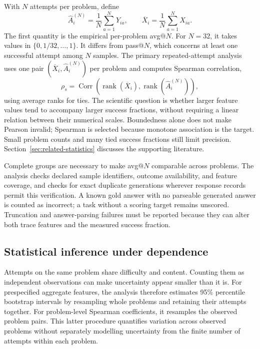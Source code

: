 \documentclass[12pt,a4paper,twoside,openright]{book}
\begin{document}
With $N$ attempts per problem, define
\begin{equation}
  \widehat A_i^{(N)}=\frac{1}{N}\sum_{a=1}^{N}Y_{ia},
  \qquad \overline X_i=\frac{1}{N}\sum_{a=1}^{N}X_{ia}.
  \label{eq:average-accuracy}
\end{equation}
The first quantity is the empirical per-problem avg@$N$. For $N=32$, it
takes values in $\{0,1/32,\ldots,1\}$. It differs from pass@$N$, which concerns
at least one successful attempt among $N$ samples. The primary repeated-attempt
analysis uses one pair $(\overline X_i,\widehat A_i^{(N)})$ per problem and
computes Spearman correlation,
\begin{equation}
  \rho_s=\operatorname{Corr}\!\left(
    \operatorname{rank}(\overline X_i),
    \operatorname{rank}(\widehat A_i^{(N)})\right),
  \label{eq:spearman}
\end{equation}
using average ranks for ties. The scientific question is whether larger
feature values tend to accompany larger success fractions, without requiring
a linear relation between their numerical scales. Boundedness alone does not
make Pearson invalid; Spearman is selected because monotone association is
the target. Small problem counts and many tied success fractions still limit
precision. Section~\ref{sec:related-statistics} discusses the supporting
literature.

Complete groups are necessary to make avg@$N$ comparable across problems.
The analysis checks declared sample identifiers, outcome availability, and
feature coverage, and checks for exact duplicate generations wherever
response records permit this verification. A known gold answer with no parseable generated
answer is counted as incorrect; a task without a scoring target remains
unscored. Truncation and answer-parsing failures must be reported because
they can alter both trace features and the measured success fraction.

\subsection{Statistical inference under dependence}

Attempts on the same problem share difficulty and content. Counting them as
independent observations can make uncertainty appear smaller than it is.
For prespecified aggregate features, the analysis therefore estimates
95\% percentile bootstrap intervals by resampling whole problems and retaining
their attempts together. For problem-level Spearman coefficients, it
resamples the observed problem pairs. This latter procedure quantifies
variation across observed problems without separately modelling uncertainty
from the finite number of attempts within each problem.
\end{document}
